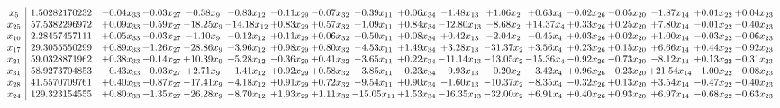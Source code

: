 \documentclass[9pt]{article}
\begin{document}
 \[\begin{array}{c| c c@{\hskip 2pt} c@{\hskip 2pt} c@{\hskip 2pt} c@{\hskip 2pt} c@{\hskip 2pt} c@{\hskip 2pt} c@{\hskip 2pt} c@{\hskip 2pt} c@{\hskip 2pt} c@{\hskip 2pt} c@{\hskip 2pt} c@{\hskip 2pt} c@{\hskip 2pt} c@{\hskip 2pt} c@{\hskip 2pt} c@{\hskip 2pt} }
 x_{5}   &  1.50282170232 & -0.04 x_{33} & -0.03 x_{27} & -0.38 x_{9} & -0.83 x_{12} & -0.11 x_{29} & -0.07 x_{32} & -0.39 x_{11} & +  0.06 x_{34} & -1.48 x_{13} & +  1.06 x_{2} & +  0.63 x_{4} & -0.02 x_{26} & -0.05 x_{20} & -1.87 x_{14} & +  0.01 x_{22} & +  0.04 x_{23}\\
 x_{25}   &  57.5382296972 & +  0.09 x_{33} & -0.59 x_{27} & -18.25 x_{9} & -14.18 x_{12} & +  0.83 x_{29} & +  0.57 x_{32} & +  1.09 x_{11} & +  0.84 x_{34} & -12.80 x_{13} & -8.68 x_{2} & + 14.37 x_{4} & +  0.33 x_{26} & +  0.25 x_{20} & +  7.80 x_{14} & -0.01 x_{22} & -0.40 x_{23}\\
 x_{10}   &  2.28457457111 & +  0.05 x_{33} & -0.03 x_{27} & -1.10 x_{9} & -0.12 x_{12} & +  0.11 x_{29} & +  0.06 x_{32} & +  0.50 x_{11} & +  0.08 x_{34} & +  0.42 x_{13} & -2.04 x_{2} & -0.45 x_{4} & +  0.03 x_{26} & +  0.02 x_{20} & +  1.00 x_{14} & -0.03 x_{22} & -0.06 x_{23}\\
 x_{17}   &  29.3055550299 & +  0.89 x_{33} & -1.26 x_{27} & -28.86 x_{9} & +  3.96 x_{12} & +  0.98 x_{29} & +  0.80 x_{32} & -4.53 x_{11} & +  1.49 x_{34} & +  3.28 x_{13} & -31.37 x_{2} & +  3.56 x_{4} & +  0.23 x_{26} & +  0.15 x_{20} & +  6.66 x_{14} & +  0.44 x_{22} & -0.92 x_{23}\\
 x_{21}   &  59.0328871962 & +  0.38 x_{33} & -0.14 x_{27} & + 10.39 x_{9} & +  5.28 x_{12} & -0.36 x_{29} & +  0.41 x_{32} & -3.65 x_{11} & +  0.22 x_{34} & -11.14 x_{13} & -13.05 x_{2} & -15.36 x_{4} & -0.92 x_{26} & -0.73 x_{20} & -8.12 x_{14} & +  0.13 x_{22} & -0.31 x_{23}\\
 x_{31}   &  58.9273704853 & -0.43 x_{33} & -0.03 x_{27} & +  2.71 x_{9} & -1.41 x_{12} & +  0.92 x_{29} & +  0.58 x_{32} & +  3.85 x_{11} & -0.23 x_{34} & -9.93 x_{13} & -0.20 x_{2} & -3.42 x_{4} & +  0.96 x_{26} & -0.23 x_{20} & + 21.54 x_{14} & -1.00 x_{22} & -0.08 x_{23}\\
 x_{28}   &  41.5570709761 & +  0.40 x_{33} & -0.87 x_{27} & -17.41 x_{9} & -4.18 x_{12} & +  0.91 x_{29} & +  0.72 x_{32} & -9.54 x_{11} & +  0.90 x_{34} & -1.60 x_{13} & -10.37 x_{2} & -8.35 x_{4} & -0.32 x_{26} & +  0.13 x_{20} & +  3.54 x_{14} & -0.47 x_{22} & -0.40 x_{23}\\
 x_{24}   &  129.323154555 & +  0.80 x_{33} & -1.35 x_{27} & -26.28 x_{9} & -8.70 x_{12} & +  1.93 x_{29} & +  1.11 x_{32} & -15.05 x_{11} & +  1.53 x_{34} & -16.35 x_{13} & -32.00 x_{2} & +  6.91 x_{4} & +  0.40 x_{26} & +  0.93 x_{20} & +  6.97 x_{14} & -0.68 x_{22} & -0.63 x_{23}\\

\end{array}\]
\end{document}
